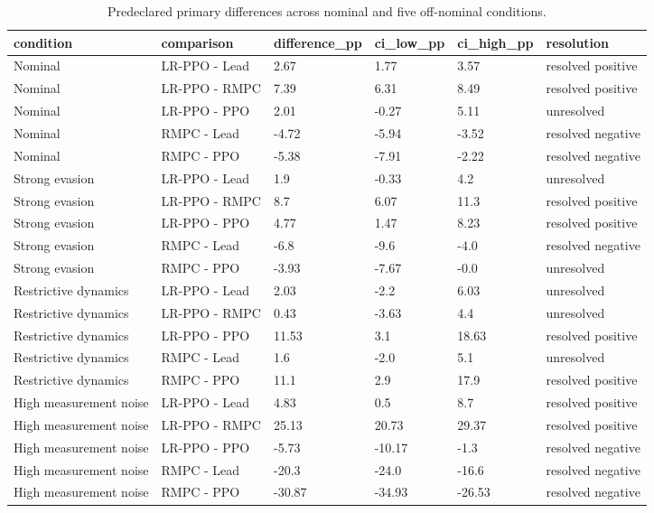 \begin{table}[t]
\centering
\caption{Predeclared primary differences across nominal and five off-nominal conditions.}
\label{tab:robustness_differences}
\begin{tabular}{llllll}
\hline
condition & comparison & difference_pp & ci_low_pp & ci_high_pp & resolution \\
\hline
Nominal & LR-PPO - Lead & 2.67 & 1.77 & 3.57 & resolved positive \\
Nominal & LR-PPO - RMPC & 7.39 & 6.31 & 8.49 & resolved positive \\
Nominal & LR-PPO - PPO & 2.01 & -0.27 & 5.11 & unresolved \\
Nominal & RMPC - Lead & -4.72 & -5.94 & -3.52 & resolved negative \\
Nominal & RMPC - PPO & -5.38 & -7.91 & -2.22 & resolved negative \\
Strong evasion & LR-PPO - Lead & 1.9 & -0.33 & 4.2 & unresolved \\
Strong evasion & LR-PPO - RMPC & 8.7 & 6.07 & 11.3 & resolved positive \\
Strong evasion & LR-PPO - PPO & 4.77 & 1.47 & 8.23 & resolved positive \\
Strong evasion & RMPC - Lead & -6.8 & -9.6 & -4.0 & resolved negative \\
Strong evasion & RMPC - PPO & -3.93 & -7.67 & -0.0 & unresolved \\
Restrictive dynamics & LR-PPO - Lead & 2.03 & -2.2 & 6.03 & unresolved \\
Restrictive dynamics & LR-PPO - RMPC & 0.43 & -3.63 & 4.4 & unresolved \\
Restrictive dynamics & LR-PPO - PPO & 11.53 & 3.1 & 18.63 & resolved positive \\
Restrictive dynamics & RMPC - Lead & 1.6 & -2.0 & 5.1 & unresolved \\
Restrictive dynamics & RMPC - PPO & 11.1 & 2.9 & 17.9 & resolved positive \\
High measurement noise & LR-PPO - Lead & 4.83 & 0.5 & 8.7 & resolved positive \\
High measurement noise & LR-PPO - RMPC & 25.13 & 20.73 & 29.37 & resolved positive \\
High measurement noise & LR-PPO - PPO & -5.73 & -10.17 & -1.3 & resolved negative \\
High measurement noise & RMPC - Lead & -20.3 & -24.0 & -16.6 & resolved negative \\
High measurement noise & RMPC - PPO & -30.87 & -34.93 & -26.53 & resolved negative \\

\end{tabular}
\end{table}

